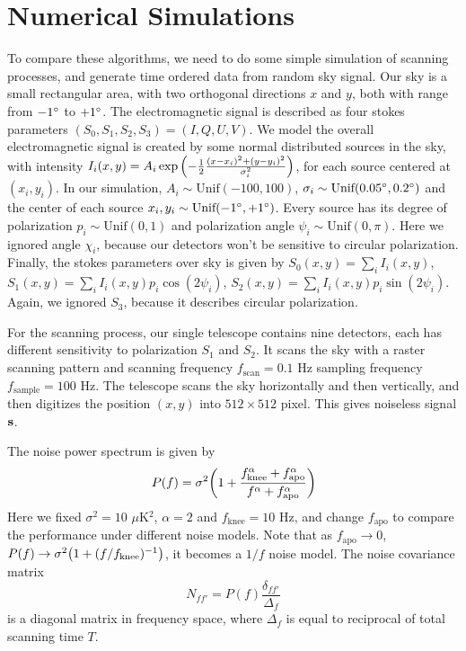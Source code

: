 \documentclass[11pt, letterpaper]{article}
\begin{document}
\section{Numerical Simulations}
To compare these algorithms, we need to do some simple simulation of scanning
processes, and generate time ordered data from random sky signal.
Our sky is a small rectangular area, with two orthogonal directions $x$ and
$y$, both with range from $-1\degree$ to $+1\degree$.
The electromagnetic signal is described as four stokes parameters
$(S_0, S_1, S_2, S_3) = (I,Q,U,V)$.
We model the overall electromagnetic signal is created by some normal
distributed sources in the sky, with intensity $I_i (x,y)
= A_i \exp\qty(-\frac{1}{2} \frac{(x-x_{i})^2 + (y-y_{i})^2}{\sigma_i^2})$,
for each source centered at $(x_i,y_i)$.
In our simulation, $A_i \sim \text{Unif} (-100, 100)$,
$\sigma_i \sim \text{Unif}(0.05\degree, 0.2\degree)$ 
and the center of each source
$x_i, y_i \sim \text{Unif}(-1\degree, +1\degree)$.
Every source has its degree of polarization $p_i \sim \text{Unif}(0,1)$ and 
polarization angle $\psi_i \sim \text{Unif}(0,\pi)$.
Here we ignored angle $\chi_i$, because our detectors won't be sensitive to
circular polarization.
Finally, the stokes parameters over sky is given by
$S_0(x,y) = \sum_i I_i(x,y)$, $S_1(x,y) = \sum_i I_i(x,y) p_i \cos(2\psi_i)$,
$S_2(x,y) = \sum_i I_i(x,y) p_i \sin(2\psi_i)$.
Again, we ignored $S_3$, because it describes circular polarization.

For the scanning process, our single telescope contains nine detectors,
each has different sensitivity to polarization $S_1$ and $S_2$.
It scans the sky with a raster scanning pattern and scanning frequency
$f_{\text{scan}} = 0.1$ Hz sampling frequency $f_{\text{sample}} = 100$ Hz.
The telescope scans the sky horizontally and then vertically,
and then digitizes the position $(x, y)$ into $512\times 512$ pixel.
This gives noiseless signal $\vb{s}$.

The noise power spectrum is given by
\begin{align}
P(f) = \sigma^2 \qty(1+ \frac{f_{\text{knee}}^{\alpha}+f_{\text{apo}}^{\alpha}}
    {f^{\alpha}+f_{\text{apo}}^{\alpha}}) \label{noise power spectrum}
\end{align}
Here we fixed $\sigma^2 = 10$ $\mu$K$^2$, $\alpha = 2$ and $f_{\text{knee}} = 10$ Hz,
and change $f_{\text{apo}}$ to compare the performance under different noise
models.
Note that as $f_{\text{apo}} \rightarrow 0 $,
$P(f) \rightarrow \sigma^2\qty(1 + (f/f_{\text{knee}})^{-1} )$, 
it becomes a $1/f$ noise model.
The noise covariance matrix 
\begin{equation}
N_{ff'} = P(f) \frac{\delta_{ff'}}{\Delta_f}
\end{equation}
is a diagonal matrix in frequency space, where $\Delta_f$ is equal to reciprocal
of total scanning time $T$.
\end{document}
